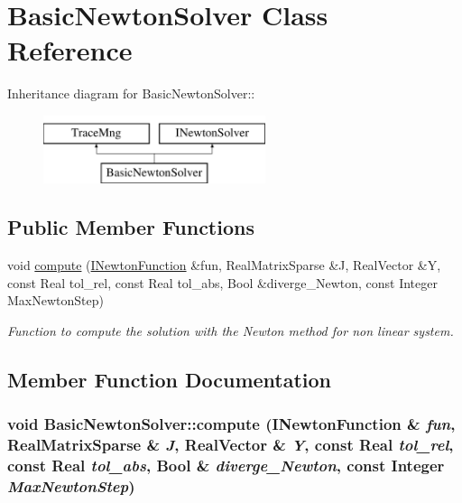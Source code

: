 \hypertarget{classBasicNewtonSolver}{
\section{BasicNewtonSolver Class Reference}
\label{classBasicNewtonSolver}
}
Inheritance diagram for BasicNewtonSolver::\begin{figure}[H]
\begin{center}
\leavevmode
\includegraphics[height=2cm]{classBasicNewtonSolver}
\end{center}
\end{figure}
\subsection*{Public Member Functions}
\begin{DoxyCompactItemize}
\item 
void \hyperlink{classBasicNewtonSolver_a24d27f55e338412dbd6337087a25190a}{compute} (\hyperlink{classINewtonFunction}{INewtonFunction} \&fun, RealMatrixSparse \&J, RealVector \&Y, const Real tol\_\-rel, const Real tol\_\-abs, Bool \&diverge\_\-Newton, const Integer MaxNewtonStep)
\begin{DoxyCompactList}\small\item\em Function to compute the solution with the Newton method for non linear system. \item\end{DoxyCompactList}\end{DoxyCompactItemize}


\subsection{Member Function Documentation}
\hypertarget{classBasicNewtonSolver_a24d27f55e338412dbd6337087a25190a}{
\subsubsection[{compute}]{\setlength{\rightskip}{0pt plus 5cm}void BasicNewtonSolver::compute ({\bf INewtonFunction} \& {\em fun}, \/  RealMatrixSparse \& {\em J}, \/  RealVector \& {\em Y}, \/  const Real {\em tol\_\-rel}, \/  const Real {\em tol\_\-abs}, \/  Bool \& {\em diverge\_\-Newton}, \/  const Integer {\em MaxNewtonStep})}}
\label{classBasicNewtonSolver_a24d27f55e338412dbd6337087a25190a}


